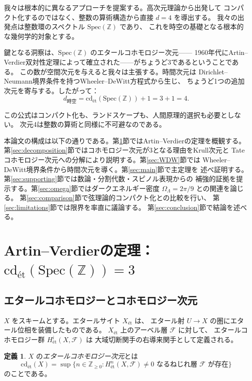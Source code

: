 \documentclass[12pt,a4paper]{article}
\theoremstyle{definition}
\newtheorem{definition}[theorem]{定義}
\newcommand{\Spec}{\mathrm{Spec}}
\newcommand{\cd}{\mathrm{cd}}
\newcommand{\ZZ}{\mathbb{Z}}
\begin{document}
我々は根本的に異なるアプローチを提案する。高次元理論から出発して
コンパクト化するのではなく、整数の算術構造から直接 $d=4$ を導出する。
我々の出発点は整数環のスペクトル $\Spec(\ZZ)$ であり、
これを時空の基礎となる根本的な幾何学的対象とする。

鍵となる洞察は、$\Spec(\ZZ)$ のエタールコホモロジー次元——
1960年代にArtin--Verdier双対性定理によって確立された——がちょうど3であるということである。
この数が空間次元を与えると我々は主張する。時間次元は
Dirichlet--Neumann境界条件を持つWheeler--DeWitt方程式から生じ、
ちょうど1つの追加次元を寄与する。したがって：
\[
  d_{\text{時空}} = \cd_{\text{\'et}}(\Spec(\ZZ)) + 1 = 3 + 1 = 4.
\]

この公式はコンパクト化も、ランドスケープも、人間原理的選択も必要としない。
次元4は整数の算術と同様に不可避なのである。

本論文の構成は以下の通りである。第\ref{sec:AV}節ではArtin--Verdierの定理を概観する。
第\ref{sec:decomposition}節ではコホモロジー次元が3となる理由をKrull次元と
Tateコホモロジー次元への分解により説明する。第\ref{sec:WDW}節では
Wheeler--DeWitt境界条件から時間次元を導く。第\ref{sec:main}節で主定理を
述べ証明する。第\ref{sec:supporting}節では数論・分割代数・スピノル表現からの
補強的証拠を提示する。第\ref{sec:omega}節ではダークエネルギー密度
$\Omega_\Lambda = 2\pi/9$ との関連を論じる。
第\ref{sec:comparison}節で弦理論的コンパクト化との比較を行い、
第\ref{sec:limitations}節では限界を率直に議論する。
第\ref{sec:conclusion}節で結論を述べる。

\section{Artin--Verdierの定理：$\cd_{\text{\'et}}(\Spec(\ZZ)) = 3$}\label{sec:AV}

\subsection{エタールコホモロジーとコホモロジー次元}

$X$ をスキームとする。エタールサイト $X_{\text{\'et}}$ は、
エタール射 $U \to X$ の圏にエタール位相を装備したものである。
$X_{\text{\'et}}$ 上のアーベル層 $\mathscr{F}$ に対して、
エタールコホモロジー群 $H^i_{\text{\'et}}(X, \mathscr{F})$ は
大域切断関手の右導来関手として定義される。

\begin{definition}
$X$ の\emph{エタールコホモロジー次元}とは
\[
  \cd_{\text{\'et}}(X) = \sup\{n \in \ZZ_{\geq 0} : H^n_{\text{\'et}}(X, \mathscr{F})
  \neq 0 \text{ なるねじれ層 } \mathscr{F} \text{ が存在}\}
\]
のことである。
\end{definition}
\end{document}
